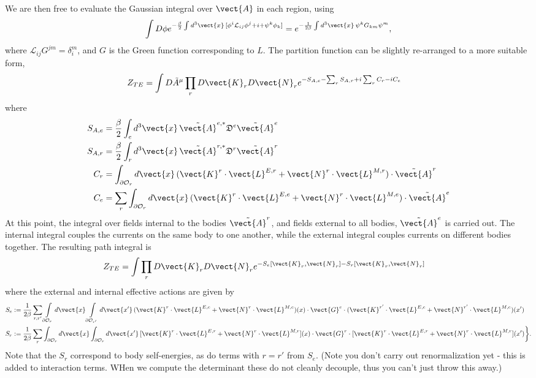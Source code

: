 We are then free to evaluate the Gaussian integral over $\vect{A}$ in each region, using
\begin{equation}
  \int D\phi e^{-\frac{\beta}{2}\int d^3\vect{x}\, [\phi^i \mathcal{L}_{ij}\phi^j +i+\psi^k\phi_k]}
= e^{-\frac{1}{2\beta}\int d^3\vect{x}\,\psi^k G_{km} \psi^m},
\end{equation}
where $\mathcal{L}_{ij}G^{jm} = \delta_{i}^m$, and $G$ is the Green function corresponding to $L$.
The partition function can be slightly re-arranged to a more suitable form,
\begin{align}
  Z_{TE} &= \int D\tilde{A}^\mu \prod_rD\vect{K}_rD\vect{N}_re^{-S_{A,e}-\sum_rS_{A,r}+i\sum_rC_r-iC_e}
\end{align}
where 
\begin{align}
  S_{A,e}&=\frac{\beta}{2}\int_e d^3\vect{x}\,  \tilde{\vect{A}}^{e,*} \mathfrak{D}^e\tilde{\vect{A}}^e \\
 S_{A,r}&=\frac{\beta}{2}\int_r d^3\vect{x}\, \tilde{\vect{A}}^{r,*} \mathfrak{D}^r\tilde{\vect{A}}^r\\
 C_r &=\int_{\partial\mathcal{O}_r}d\vect{x}\,
 (\vect{K}^r\cdot\vect{L}^{E,r} + \vect{N}^r\cdot\vect{L}^{M,r})\cdot\tilde{\vect{A}}^r\\
 C_e&=\sum_{r}\int_{\partial\mathcal{O}_r}d\vect{x}\,
 (\vect{K}^r\cdot\vect{L}^{E,e} + \vect{N}^r\cdot\vect{L}^{M,e})\cdot\tilde{\vect{A}}^e
\end{align}
At this point, the integral over fields internal to the bodies $\tilde{\vect{A}}^r$, and fields 
external to all bodies, $\tilde{\vect{A}}^e$ is carried out.  The internal integral couples the currents
on the same body to one another, while the external integral couples currents on different bodies together.
The resulting path integral is
\begin{align}
  Z_{TE} &= \int \prod_rD\vect{K}_rD\vect{N}_re^{-S_e[\vect{K}_r,\vect{N}_r] - S_r[\vect{K}_r,\vect{N}_r] }
\end{align}
where the external and internal effective actions are given by 
\begin{align}
  S_e&:=\frac{1}{2\beta}\sum_{r,r'}
  \int\limits_{\partial\mathcal{O}_r}d\vect{x}\int\limits_{\partial\mathcal{O}_{r'}}d\vect{x'}\, 
  (\vect{K}^r\cdot\vect{L}^{E,e} + \vect{N}^r\cdot\vect{L}^{M,e})(x)\cdot\vect{G}^e\cdot
  (\vect{K}^{r'}\cdot\vect{L}^{E,e} + \vect{N}^{r'}\cdot\vect{L}^{M,e})(x')\\
  S_r&:= \frac{1}{2\beta}\sum_{r}\int_{\partial\mathcal{O}_r}d\vect{x}\int_{\partial\mathcal{O}_r}d\vect{x'}\,
    [\vect{K}^r\cdot\vect{L}^{E,r} + \vect{N}^r\cdot\vect{L}^{M,r}](x)\cdot
    \vect{G}^r\cdot[\vect{K}^r\cdot\vect{L}^{E,r} + \vect{N}^r\cdot\vect{L}^{M,r}](x')\bigg\}.
\end{align}
Note that the $S_r$ correspond to body self-energies, as do terms with $r=r'$ from $S_e$.
(Note you don't carry out renormalization yet - this is added to interaction terms.  WHen we compute
the determinant these do not cleanly decouple, thus you can't just throw this away.)

